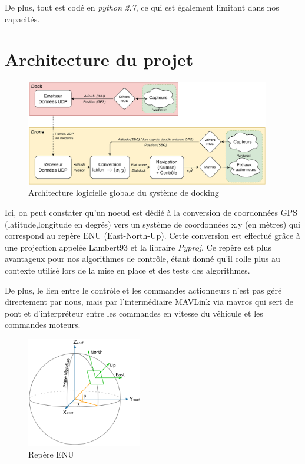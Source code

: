 \documentclass[12pt]{report}
\begin{document}
De plus, tout est codé en \textit{python 2.7}, ce qui est également limitant dans nos capacités.

\section{Architecture du projet}

\begin{figure}[H]
    \centering
    \includegraphics[width=0.95\textwidth]{imgs/schema_general.png}
    \caption{Architecture logicielle globale du système de docking}
    \label{fig:schema_general}
\end{figure}

Ici, on peut constater qu'un noeud est dédié à la conversion de coordonnées GPS (latitude,longitude
en degrés) vers un système de coordonnées x,y (en mètres) qui correspond au repère ENU (East-North-Up).
Cette conversion est effectué grâce à une projection appelée Lambert93 et la libraire \textit{Pyproj}.
Ce repère est plus avantageux pour nos algorithmes de contrôle, étant donné qu'il colle plus au contexte
utilisé lors de la mise en place et des tests des algorithmes.

De plus, le lien entre le contrôle et les commandes actionneurs n'est pas géré directement par nous, mais
par l'intermédiaire MAVLink via mavros qui sert de pont et d'interpréteur entre les commandes en vitesse
du véhicule et les commandes moteurs.

\begin{figure}[!h]
  \centering
  \includegraphics[width=5cm]{imgs/ENU.png}
  \caption{Repère ENU}
  \label{fig:schema_ENU}
\end{figure}
\end{document}
